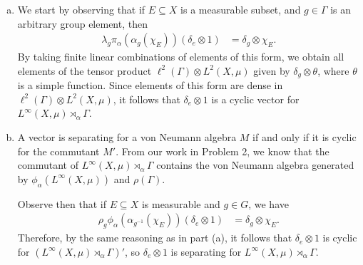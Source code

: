 \documentclass[10pt]{mypackage}
\begin{document}
\begin{solution}\hfill
  \begin{enumerate}[(a)]
    \item We start by observing that if $E\subseteq X$ is a measurable subset, and $g\in \Gamma$ is an arbitrary group element, then
      \begin{align*}
        \lambda_g \pi_{\alpha}\left( \alpha_g\left( \chi_E \right) \right)\left( \delta_e\otimes 1 \right) &= \delta_g\otimes \chi_{E}.
      \end{align*}
      By taking finite linear combinations of elements of this form, we obtain all elements of the tensor product $\ell^2\left( \Gamma \right)\otimes L^{2}\left( X,\mu \right)$ given by $\delta_g\otimes \theta$, where $\theta$ is a simple function. Since elements of this form are dense in $\ell^2\left( \Gamma \right)\otimes L^2\left( X,\mu \right)$, it follows that $\delta_e\otimes 1$ is a cyclic vector for $L^{\infty}\left( X,\mu \right)\rtimes_{\alpha}\Gamma$.
    \item A vector is separating for a von Neumann algebra $M$ if and only if it is cyclic for the commutant $M'$. From our work in Problem 2, we know that the commutant of $L^{\infty}\left( X,\mu \right)\rtimes_{\alpha}\Gamma$ contains the von Neumann algebra generated by $\phi_{\alpha}\left( L^{\infty}\left( X,\mu \right) \right)$ and $\rho\left( \Gamma \right)$.

      Observe then that if $E\subseteq X$ is measurable and $g\in G$, we have
      \begin{align*}
        \rho_g\phi_{\alpha}\left( \alpha_{g^{-1}}\left( \chi_E \right) \right)\left( \delta_e\otimes 1 \right) &= \delta_g\otimes \chi_E.
      \end{align*}
      Therefore, by the same reasoning as in part (a), it follows that $\delta_e\otimes 1$ is cyclic for $\left( L^{\infty}\left( X,\mu \right)\rtimes_{\alpha}\Gamma \right)'$, so $\delta_e\otimes 1$ is separating for $L^{\infty}\left( X,\mu \right)\rtimes_{\alpha}\Gamma$.
  \end{enumerate}
\end{solution}
\end{document}
